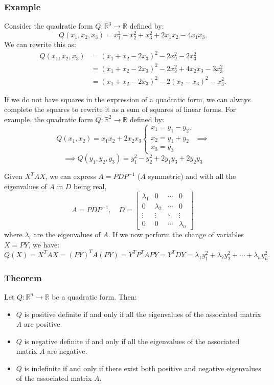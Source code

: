 \documentclass[11pt]{article}
\begin{document}
\pagebreak

\subsubsection*{Example}
Consider the quadratic form \(Q : \mathbb{R}^3 \to \mathbb{R}\) defined by:
\[Q(x_1, x_2, x_3) = x_1^2 - x_2^2 + x_3^2 + 2 x_1 x_2 - 4 x_1 x_3.\]
We can rewrite this as:
\begin{align*}
Q(x_1, x_2, x_3) & = (x_1 + x_2 - 2 x_3)^2 - 2 x_2^2 - 2 x_3^2 \\
& = (x_1 + x_2 - 2 x_3)^2 - 2x_2^2 + 4 x_2 x_3 - 3 x_3^2 \\
& = (x_1 + x_2 - 2 x_3)^2 - 2(x_2 - x_3)^2 - x_3^2.
\end{align*}

\begin{remark}
    If we do not have squares in the expression of a quadratic form, we can always complete the squares to rewrite it as a sum of squares of linear forms. For example, the quadratic form \(Q : \mathbb{R}^2 \to \mathbb{R}\) defined by:
\[Q(x_1, x_2) = x_1 x_2 + 2 x_2 x_3 \begin{cases}
    x_1 = y_1 - y_2, \\
    x_2 = y_1 + y_2 \\
    x_3 = y_3
\end{cases} \implies \]
\[\implies Q(y_1, y_2, y_3) = y_1^2 - y_2^2 + 2 y_1 y_3 + 2 y_2 y_3 \]
\end{remark}

\begin{remark}
    Given \(X^T A X\), we can express \(A = P D P^{-1}\) (\(A\) symmetric) and with all the eigenvalues of \(A\) in \(D\) being real, 
    \[A = P D P^{-1}, \quad D = \begin{bmatrix}
    \lambda_1 & 0 & \cdots & 0 \\
    0 & \lambda_2 & \cdots & 0 \\
    \vdots & \vdots & \ddots & \vdots \\
    0 & 0 & \cdots & \lambda_n
    \end{bmatrix} \]
    where \(\lambda_i\) are the eigenvalues of \(A\). If we now perform the change of variables \(X = P Y\), we have:
    \[Q(X) = X^T A X = (P Y)^T A (P Y) = Y^T P^T A P Y = Y^T D Y = \lambda_1 y_1^2 + \lambda_2 y_2^2 + \cdots + \lambda_n y_n^2.\]
\end{remark}

\subsubsection*{Theorem}
Let \(Q : \mathbb{R}^n \to \mathbb{R}\) be a quadratic form. Then:
\begin{itemize}
    \item \(Q\) is positive definite if and only if all the eigenvalues of the associated matrix \(A\) are positive.
    \item \(Q\) is negative definite if and only if all the eigenvalues of the associated matrix \(A\) are negative.
    \item \(Q\) is indefinite if and only if there exist both positive and negative eigenvalues of the associated matrix \(A\).
\end{itemize}
\end{document}
